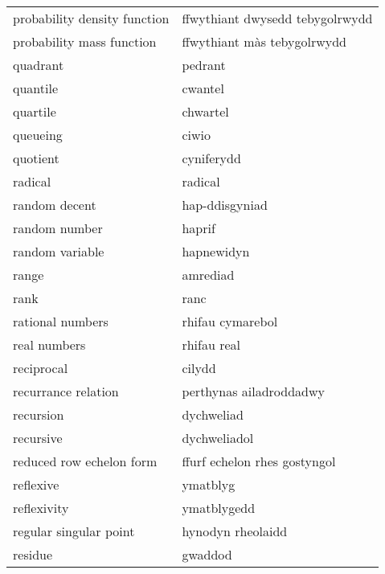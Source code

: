 \begin{supertabular}{p{0.22\textwidth}p{0.22\textwidth}}
     probability density function &  ffwythiant dwysedd tebygolrwydd \\
        probability mass function &      ffwythiant màs tebygolrwydd \\
                         quadrant &                          pedrant \\
                         quantile &                          cwantel \\
                         quartile &                         chwartel \\
                         queueing &                            ciwio \\
                         quotient &                       cyniferydd \\
                          radical &                          radical \\
                    random decent &                   hap-ddisgyniad \\
                    random number &                           haprif \\
                  random variable &                       hapnewidyn \\
                            range &                         amrediad \\
                             rank &                             ranc \\
                 rational numbers &                 rhifau cymarebol \\
                     real numbers &                      rhifau real \\
                       reciprocal &                           cilydd \\
              recurrance relation &          perthynas ailadroddadwy \\
                        recursion &                       dychweliad \\
                        recursive &                     dychweliadol \\
         reduced row echelon form &     ffurf echelon rhes gostyngol \\
                        reflexive &                         ymatblyg \\
                      reflexivity &                      ymatblygedd \\
           regular singular point &                hynodyn rheolaidd \\
                          residue &                          gwaddod \\

\end{supertabular}
